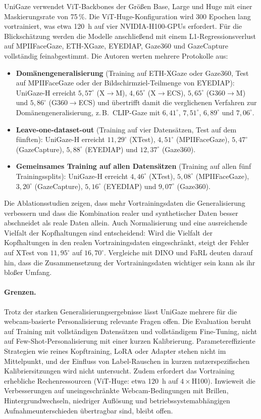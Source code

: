 \documentclass[
  11pt,
  a4paper,
  oneside,
  DIV=12,                 %
  BCOR=8mm,               %
  parskip=half,           %
  headings=normal,
  bibliography=totoc,     %
  listof=totoc            %
]{scrreprt}
\begin{document}
UniGaze verwendet ViT-Backbones der Größen Base, Large und Huge mit einer Maskierungsrate von 75\,\%. Die ViT-Huge-Konfiguration wird 300 Epochen lang vortrainiert, was etwa \SI{120}{\hour} auf vier NVIDIA-H100-GPUs erfordert. Für die Blickschätzung werden die Modelle anschließend mit einem L1-Regressionsverlust auf MPIIFaceGaze, ETH-XGaze, EYEDIAP, Gaze360 und GazeCapture vollständig feinabgestimmt. Die Autoren werten mehrere Protokolle aus:
\begin{itemize}
  \item \textbf{Domänengeneralisierung} (Training auf ETH-XGaze oder Gaze360, Test auf MPIIFaceGaze oder der Bildschirmziel-Teilmenge von EYEDIAP): UniGaze-H erreicht $5,57^\circ$ (X$\rightarrow$M), $4,65^\circ$ (X$\rightarrow$ECS), $5,65^\circ$ (G360$\rightarrow$M) und $5,86^\circ$ (G360$\rightarrow$ECS) und übertrifft damit die verglichenen Verfahren zur Domänengeneralisierung, z.\,B.\ CLIP-Gaze mit $6,41^\circ$, $7,51^\circ$, $6,89^\circ$ und $7,06^\circ$.
  \item \textbf{Leave-one-dataset-out} (Training auf vier Datensätzen, Test auf dem fünften): UniGaze-H erreicht $11,29^\circ$ (XTest), $4,51^\circ$ (MPIIFaceGaze), $5,47^\circ$ (GazeCapture), $5,88^\circ$ (EYEDIAP) und $12,37^\circ$ (Gaze360).
  \item \textbf{Gemeinsames Training auf allen Datensätzen} (Training auf allen fünf Trainingssplits): UniGaze-H erreicht $4,46^\circ$ (XTest), $5,08^\circ$ (MPIIFaceGaze), $3,20^\circ$ (GazeCapture), $5,16^\circ$ (EYEDIAP) und $9,07^\circ$ (Gaze360).
\end{itemize}

Die Ablationsstudien zeigen, dass mehr Vortrainingsdaten die Generalisierung verbessern und dass die Kombination realer und synthetischer Daten besser abschneidet als reale Daten allein. Auch Normalisierung und eine ausreichende Vielfalt der Kopfhaltungen sind entscheidend: Wird die Vielfalt der Kopfhaltungen in den realen Vortrainingsdaten eingeschränkt, steigt der Fehler auf XTest von $11,95^\circ$ auf $16,70^\circ$. Vergleiche mit DINO und FaRL deuten darauf hin, dass die Zusammensetzung der Vortrainingsdaten wichtiger sein kann als ihr bloßer Umfang.

\paragraph{Grenzen.}
Trotz der starken Generalisierungsergebnisse lässt UniGaze mehrere für die webcam-basierte Personalisierung relevante Fragen offen. Die Evaluation beruht auf Training mit vollständigen Datensätzen und vollständigem Fine-Tuning, nicht auf Few-Shot-Personalisierung mit einer kurzen Kalibrierung. Parametereffiziente Strategien wie reines Kopftraining, LoRA oder Adapter stehen nicht im Mittelpunkt, und der Einfluss von Label-Rauschen in kurzen nutzerspezifischen Kalibriersitzungen wird nicht untersucht. Zudem erfordert das Vortraining erhebliche Rechenressourcen (ViT-Huge: etwa \SI{120}{\hour} auf $4\times$H100). Inwieweit die Verbesserungen auf uneingeschränkte Webcam-Bedingungen mit Brillen, Hintergrundwechseln, niedriger Auflösung und betriebssystemabhängigen Aufnahmeunterschieden übertragbar sind, bleibt offen.
\end{document}
